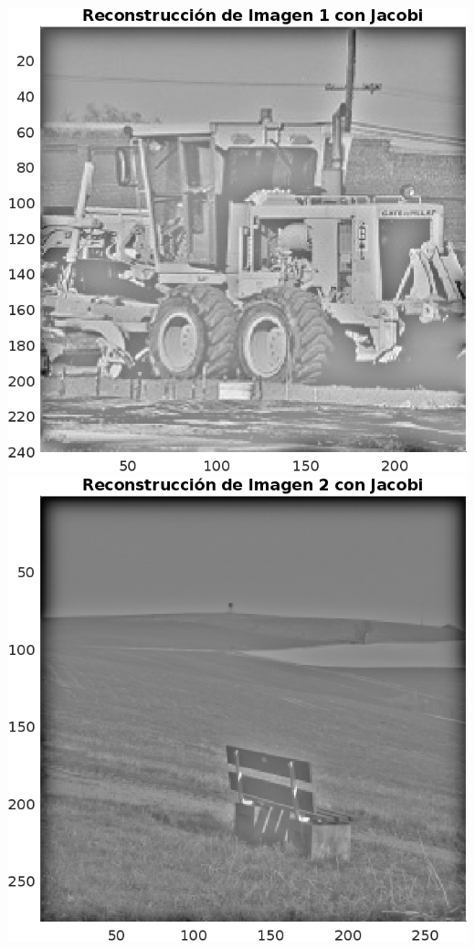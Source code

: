 \begin{homeworkProblem}
\begin{solucion}
\begin{center}
      \includegraphics[scale=0.6]{Figures/Figure_1J.png}\\
      \includegraphics[scale=0.6]{Figures/Figure_2J.png}

\end{center}
\end{solucion}
\end{homeworkProblem}
